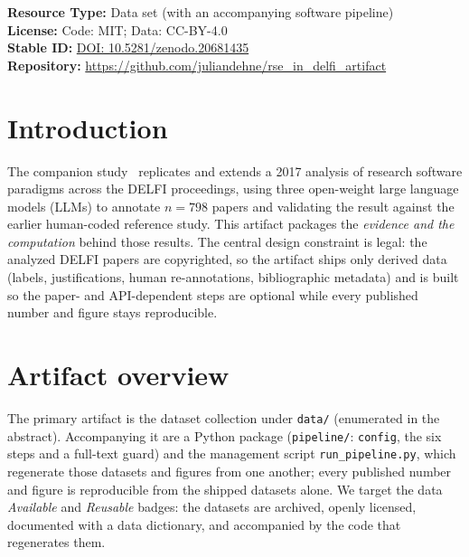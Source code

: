 \documentclass[english,biblatex]{lni}
\begin{document}
{\small
\noindent\textbf{Resource Type:} Data set (with an accompanying software pipeline)\\
\noindent\textbf{License:} Code: MIT; Data: CC-BY-4.0\\
\noindent\textbf{Stable ID:} \href{https://doi.org/10.5281/zenodo.20681435}{DOI: 10.5281/zenodo.20681435}\\
\noindent\textbf{Repository:} \url{https://github.com/juliandehne/rse_in_delfi_artifact}
\par}


\section{Introduction}
The companion study~\cite{dehne2026rseLearningTechnologies} replicates and extends
a 2017 analysis of research software paradigms across the DELFI proceedings, using
three open-weight large language models (LLMs) to annotate $n=798$ papers and
validating the result against the earlier human-coded reference study. This artifact packages the \emph{evidence and
the computation} behind those results. The central design constraint is legal: the analyzed DELFI papers are copyrighted,
so the artifact ships only derived data (labels, justifications, human
re-annotations, bibliographic metadata) and is built so the paper- and
API-dependent steps are optional while every published number and figure stays
reproducible.

\section{Artifact overview}
The primary artifact is the dataset collection under \texttt{data/} (enumerated in
the abstract). Accompanying it are a Python package (\texttt{pipeline/}:
\texttt{config}, the six steps and a full-text guard) and the management script
\texttt{run\_pipeline.py}, which regenerate those datasets and figures from one
another; every published number and figure is reproducible from the shipped
datasets alone. We target the data \emph{Available} and \emph{Reusable} badges: the
datasets are archived, openly licensed, documented with a data dictionary, and
accompanied by the code that regenerates them.
\end{document}
